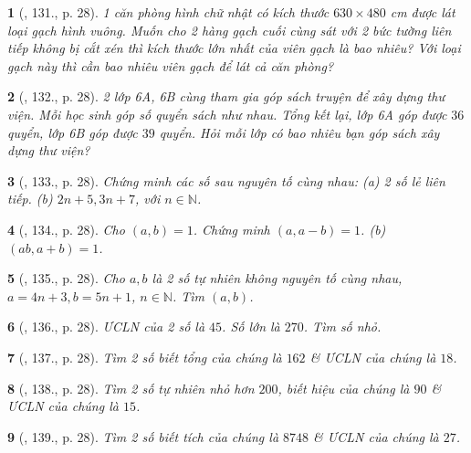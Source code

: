 \documentclass{article}
\newtheorem{baitoan}{}
\begin{document}
\begin{baitoan}[\cite{Tuyen_Toan_6}, 131., p. 28]
	1 căn phòng hình chữ nhật có kích thước $630\times480$ {\rm cm} được lát loại gạch hình vuông. Muốn cho 2 hàng gạch cuối cùng sát với 2 bức tường liên tiếp không bị cắt xén thì kích thước lớn nhất của viên gạch là bao nhiêu? Với loại gạch này thì cần bao nhiêu viên gạch để lát cả căn phòng?
\end{baitoan}

\begin{baitoan}[\cite{Tuyen_Toan_6}, 132., p. 28]
	2 lớp 6A, 6B cùng tham gia góp sách truyện để xây dựng thư viện. Mỗi học sinh góp số quyển sách như nhau. Tổng kết lại, lớp 6A góp được $36$ quyển, lớp 6B góp được $39$ quyển. Hỏi mỗi lớp có bao nhiêu bạn góp sách xây dựng thư viện?
\end{baitoan}

\begin{baitoan}[\cite{Tuyen_Toan_6}, 133., p. 28]
	Chứng minh các số sau nguyên tố cùng nhau: (a) 2 số lẻ liên tiếp. (b) $2n + 5,3n + 7$, với $n\in\mathbb{N}$.
\end{baitoan}

\begin{baitoan}[\cite{Tuyen_Toan_6}, 134., p. 28]
	Cho $(a,b) = 1$. Chứng minh $(a,a - b) = 1$. (b) $(ab,a + b) = 1$.
\end{baitoan}

\begin{baitoan}[\cite{Tuyen_Toan_6}, 135., p. 28]
	Cho $a,b$ là 2 số tự nhiên không nguyên tố cùng nhau, $a = 4n + 3,b = 5n + 1$, $n\in\mathbb{N}$. Tìm $(a,b)$.
\end{baitoan}

\begin{baitoan}[\cite{Tuyen_Toan_6}, 136., p. 28]
	{\rm ƯCLN} của 2 số là $45$. Số lớn là $270$. Tìm số nhỏ.
\end{baitoan}

\begin{baitoan}[\cite{Tuyen_Toan_6}, 137., p. 28]
	Tìm 2 số biết tổng của chúng là $162$ \& {\rm ƯCLN} của chúng là $18$.
\end{baitoan}

\begin{baitoan}[\cite{Tuyen_Toan_6}, 138., p. 28]
	Tìm 2 số tự nhiên nhỏ hơn $200$, biết hiệu của chúng là $90$ \& {\rm ƯCLN} của chúng là $15$.
\end{baitoan}

\begin{baitoan}[\cite{Tuyen_Toan_6}, 139., p. 28]
	Tìm 2 số biết tích của chúng là $8748$ \& {\rm ƯCLN} của chúng là $27$.
\end{baitoan}
\end{document}
